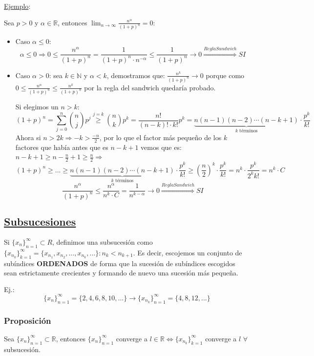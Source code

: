 \documentclass[10pt,a4paper,openright]{book}
\begin{document}
\underline{Ejemplo}:\par
Sea $p>0$ y $\alpha\in \mathbb R$, entonces $\lim_{n\rightarrow\infty}\frac{n^\alpha}{(1+p)^n}=0$:
\begin{itemize}
\item Caso $\alpha\leq 0$:
$$\alpha\leq 0\Rightarrow 0\leq \frac{n^\alpha}{(1+p)^n}=\frac{1}{(1+p)^n\cdot n^{-\alpha}}\leq \frac{1}{(1+p)^n}\rightarrow 0\stackrel{Regla Sandwich}{\Rightarrow} SI$$

\item Caso $\alpha>0$: sea $k\in \mathbb N$ y $\alpha<k$, demostramos que: $\frac{n^k}{(1+p)^n}\rightarrow 0$ porque como  $0\leq \frac{n^\alpha}{(1+p)^n}\leq \frac{n^k}{(1+p)^n}$ por la regla del sandwich quedaría probado.\par

Si elegimos un $n>k$:
$$(1+p)^n=\sum_{j=0}^n \binom{n}{j} p^j \stackrel{j=k}{\geq} \binom{n}{k}p^k=\frac{n!}{(n-k)!\cdot k!}p^k=\underbrace{n(n-1)(n-2)\cdots(n-k+1)}_{k \mbox{ términos}}\cdot \frac{p^k}{k!}$$
Ahora si $n>2k\Rightarrow -k>\frac{-n}{2}$, por lo que el factor más pequeño de los $k$ factores que había antes que es $n-k+1$ vemos que es: $n-k+1\geq n-\frac{n}{2}+1\geq \frac{n}{2} \Rightarrow $
$$(1+p)^n\geq ... \geq \underbrace{n(n-1)(n-2)\cdots (n-k+1)}_{k \mbox{ términos}}\cdot \frac{p^k}{k!}\geq \left(\frac{n}{2}\right)^k\cdot \frac{p^k}{k!}=n^k\cdot \frac{p^k}{2^kk!}=n^k\cdot C$$
$$\frac{n^\alpha}{(1+p)^n}\leq \frac{n^\alpha}{n^k\cdot C}=\frac{1}{n^{k-\alpha}}\rightarrow 0\stackrel{Regla Sandwich}{\Rightarrow} SI$$
\end{itemize}

\subsection*{\underline{Subsucesiones}}
Si $\{x_n\}_{n=1}^\infty\subset R$, definimos una subsucesión como $\{x_{n_k}\}_{k=1}^\infty=\{x_{n_1}, x_{n_2}, ..., x_{n_k}, ...\}: n_k<n_{k+1}$. Es decir, escojemos un conjunto de subíndices \textbf{ORDENADOS} de forma que la sucesión de subíndices escogidos sean estrictamente crecientes y formando de nuevo una sucesión más pequeña.\par
Ej.:
$$\{x_n\}_{n=1}^\infty =\{2,4,6,8,10,...\}\rightarrow \{x_{n_k}\}_{n=1}^\infty =\{4,8,12,...\}$$

\subsubsection*{Proposición}
Sea $\{x_n\}_{n=1}^\infty\subset \mathbb R$, entonces $\{x_n\}_{n=1}^\infty$ converge a $l\in \mathbb R\Leftrightarrow \{x_{n_k}\}_{k=1}^\infty$ converge a $l$ $\forall$ subsucesión.
\end{document}
